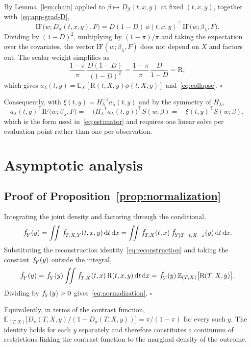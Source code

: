 \documentclass[11pt]{article}
\theoremstyle{plain}
\theoremstyle{definition}
\theoremstyle{remark}
\newcommand{\pE}{\ensuremath{\mathbb{E}}}
\newcommand{\pf}[1]{\ensuremath{\,\mathlarger{\textit{f}}_{#1}}}
\newcommand{\ratio}{\ensuremath{\pi}}
\newcommand{\contrast}{D_{\ratio}}
\newcommand{\DensityRatio}{\text{R}}
\newcommand{\dd}{\,\mathrm{d}}
\newcommand{\IF}{\mathrm{IF}}
\newcommand{\score}{S}
\begin{document}
By Lemma~\ref{lem:chain} applied to $\beta \mapsto D_\beta(t,x,y)$ at fixed $(t,x,y)$,
together with~\eqref{eq:app-grad-D},
\[
\IF\big(w;\contrast(t,x,y),F\big)
= D(1-D)\,\phi(t,x,y)^\top\,\IF\big(w;\beta_\lambda,F\big).
\]
Dividing by $(1-D)^2$, multiplying by $(1-\ratio)/\ratio$ and taking the expectation over
the covariates, the vector $\IF(w;\beta_\lambda,F)$ does not depend on $X$ and factors
out. The scalar weight simplifies as
\[
\frac{1-\ratio}{\ratio}\,\frac{D(1-D)}{(1-D)^2}
= \frac{1-\ratio}{\ratio}\,\frac{D}{1-D}
= \DensityRatio ,
\]
which gives $a_\lambda(t,y) = \pE_X[\DensityRatio(t,X,y)\phi(t,X,y)]$
and~\eqref{eq:collapse}. \hfill$\square$

Consequently, with $\xi(t,y) = H_\lambda^{-1}a_\lambda(t,y)$ and by the symmetry of
$H_\lambda$,
\[
a_\lambda(t,y)^\top \IF\big(w;\beta_\lambda,F\big)
= -\,\big( H_\lambda^{-1}a_\lambda(t,y) \big)^\top \score(w;\beta)
= -\,\xi(t,y)^\top \score(w;\beta),
\]
which is the form used in~\eqref{eq:estimator} and requires one linear solve per
evaluation point rather than one per observation.

\section{Asymptotic analysis}
\label{app:asymptotics}

\subsection{Proof of Proposition~\ref{prop:normalization}}
\label{app:asymptotics-normalization}

Integrating the joint density and factoring through the conditional,
\[
\pf{Y}(y)
= \iint \pf{T,X,Y}(t,x,y) \dd t \dd x
= \iint \pf{T,X}(t,x)\,\pf{Y \mid T=t,X=x}(y) \dd t \dd x .
\]
Substituting the reconstruction identity~\eqref{eq:reconstruction} and taking the
constant $\pf{Y}(y)$ outside the integral,
\[
\pf{Y}(y)
= \pf{Y}(y) \iint \pf{T,X}(t,x)\,\DensityRatio(t,x,y) \dd t \dd x
= \pf{Y}(y)\,\pE_{(T,X)}\big[ \DensityRatio(T,X,y) \big].
\]
Dividing by $\pf{Y}(y) > 0$ gives~\eqref{eq:normalization}. \hfill$\square$

Equivalently, in terms of the contrast function,
$\pE_{(T,X)}\big[\contrast(T,X,y)/(1-\contrast(T,X,y))\big] = \ratio/(1-\ratio)$ for
every such $y$. The identity holds for each $y$ separately and therefore constitutes a
continuum of restrictions linking the contrast function to the marginal density of the
outcome.
\end{document}
